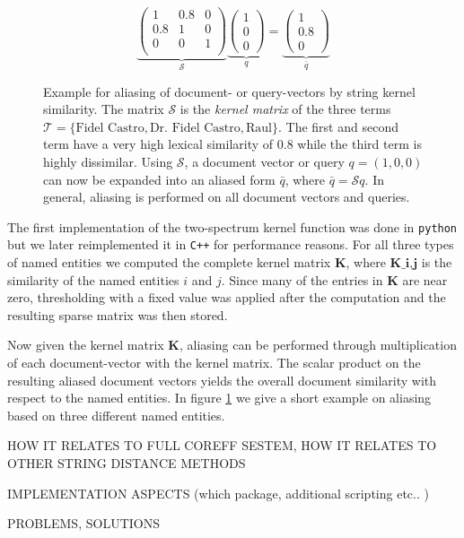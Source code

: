 \begin{figure}[ht]
  \caption{Example for aliasing of document- or query-vectors by string kernel similarity.
The matrix $\mathcal{S}$ is the \textit{kernel matrix} of the three terms $\mathcal{T} = \lbrace
\text{Fidel Castro},\text{Dr. Fidel Castro}, \text{Raul}\rbrace$. The first and second term have a
very high lexical similarity of $0.8$ while the third term is highly dissimilar. Using
$\mathcal{S}$, a document vector or query $q=(1,0,0)$ can now be expanded into an aliased form
$\bar q$, where $\bar q = \mathcal{S}q$. In general, aliasing is performed on all document vectors
and queries.}
  \[
     \underbrace{\begin{pmatrix}
      1   & 0.8 & 0\\
      0.8 & 1   & 0\\
      0   & 0   & 1\\
     \end{pmatrix}}_{\mathcal{S}}
     \underbrace{\begin{pmatrix}
     1\\ 0\\0 
     \end{pmatrix}}_{q}
     =
     \underbrace{\begin{pmatrix}
     1\\ 0.8\\0 
     \end{pmatrix}}_{\bar q}
  \]
  \label{eq:example_string_sim}
\end{figure}


The first implementation of the two-spectrum kernel function was done in \texttt{python} but we  later reimplemented it in \texttt{C++} for performance reasons. For all three types of named entities we computed the complete kernel matrix $\textbf{K}$, where $\textbf{K_{i,j}}$ is the similarity of the named entities $i$ and $j$. Since many of the entries in $\textbf{K}$ are near zero, thresholding with a fixed value was applied after the computation and the resulting sparse matrix was then stored.

Now given the kernel matrix $\textbf{K}$, aliasing can be performed through multiplication of each document-vector with the kernel matrix. The scalar product on the resulting aliased document vectors yields the overall document similarity with respect to the named entities. In figure \ref{eq:example_string_sim} we give a short example on aliasing based on three different named entities.





HOW IT RELATES TO FULL COREFF SESTEM, HOW IT RELATES TO OTHER STRING DISTANCE METHODS

IMPLEMENTATION ASPECTS (which package, additional scripting etc.. )

PROBLEMS, SOLUTIONS



